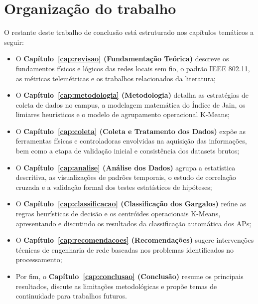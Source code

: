 \section{Organização do trabalho}
\label{sec:organizacao}

O restante deste trabalho de conclusão está estruturado nos capítulos temáticos a seguir:

\begin{itemize}
	\item O \textbf{Capítulo~\ref{cap:revisao} (Fundamentação Teórica)} descreve os fundamentos físicos e lógicos das redes locais sem fio, o padrão IEEE 802.11, as métricas telemétricas e os trabalhos relacionados da literatura;
	\item O \textbf{Capítulo~\ref{cap:metodologia} (Metodologia)} detalha as estratégias de coleta de dados no campus, a modelagem matemática do Índice de Jain, os limiares heurísticos e o modelo de agrupamento operacional K-Means;
	\item O \textbf{Capítulo~\ref{cap:coleta} (Coleta e Tratamento dos Dados)} expõe as ferramentas físicas e controladoras envolvidas na aquisição das informações, bem como a etapa de validação inicial e consistência dos datasets brutos;
	\item O \textbf{Capítulo~\ref{cap:analise} (Análise dos Dados)} agrupa a estatística descritiva, as visualizações de padrões temporais, o estudo de correlação cruzada e a validação formal dos testes estatísticos de hipóteses;
	\item O \textbf{Capítulo~\ref{cap:classificacao} (Classificação dos Gargalos)} reúne as regras heurísticas de decisão e os centróides operacionais K-Means, apresentando e discutindo os resultados da classificação automática dos APs;
	\item O \textbf{Capítulo~\ref{cap:recomendacoes} (Recomendações)} sugere intervenções técnicas de engenharia de rede baseadas nos problemas identificados no processamento;
	\item Por fim, o \textbf{Capítulo~\ref{cap:conclusao} (Conclusão)} resume os principais resultados, discute as limitações metodológicas e propõe temas de continuidade para trabalhos futuros.
\end{itemize}
